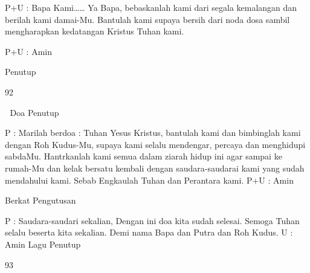 P+U : Bapa Kami…… 
Ya Bapa, bebaskanlah kami dari segala kemalangan dan 
berilah kami damai-Mu. Bantulah kami supaya bersih dari 
noda dosa sambil mengharapkan kedatangan Kristus 
Tuhan kami. 

P+U : Amin 

Penutup 

92 



Doa Penutup 

P 
: Marilah berdoa : 
Tuhan Yesus Kristus, bantulah kami dan bimbinglah kami 
dengan Roh Kudus-Mu, supaya kami selalu mendengar, 
percaya dan menghidupi sabdaMu. Hantrkanlah kami 
semua dalam ziarah hidup ini agar sampai ke rumah-Mu 
dan kelak bersatu kembali dengan saudara-saudarai kami 
yang sudah mendahului kami. Sebab Engkaulah Tuhan 
dan Perantara kami. 
P+U : Amin 

Berkat Pengutusan 

P 
: Saudara-saudari sekalian, 
Dengan ini doa kita sudah selesai. Semoga Tuhan selalu 
beserta kita sekalian. Demi nama Bapa dan Putra dan Roh 
Kudus. 
U : Amin 
Lagu Penutup 

93 



